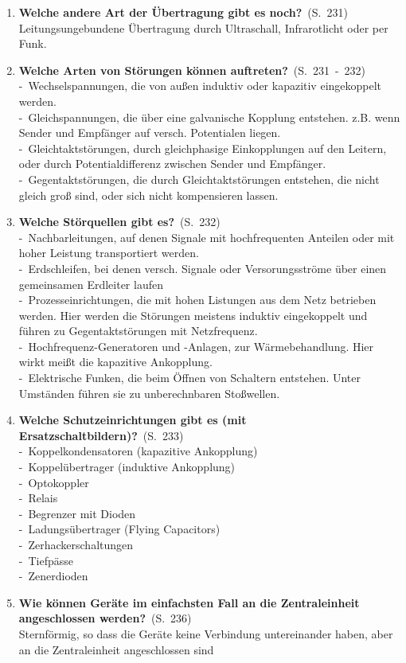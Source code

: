 \documentclass[a4paper,12pt]{article}
\newcommand{\question}[3]{\pagebreak[3]\item {\textbf{#1?}}\ (S.\ #2)#3}
\newcommand{\catchword}[1]{\\-\ #1}
\newcommand{\normaltext}[1]{\\#1}
\newcommand{\page}[1]{#1}
\newcommand{\pages}[2]{#1\ -\ #2}
\begin{document}
\begin{enumerate}
  \question{Welche andere Art der Übertragung gibt es noch}{\page{231}}
  {
    \normaltext{Leitungsungebundene Übertragung durch Ultraschall, Infrarotlicht oder per Funk.}
  }

  \question{Welche Arten von Störungen können auftreten}{\pages{231}{232}}
  {
    \catchword{Wechselspannungen, die von außen induktiv oder kapazitiv eingekoppelt werden.}
    \catchword{Gleichspannungen, die über eine galvanische Kopplung entstehen. z.B. wenn Sender und
               Empfänger auf versch. Potentialen liegen.}
    \catchword{Gleichtaktstörungen, durch gleichphasige Einkopplungen auf den Leitern, oder durch
               Potentialdifferenz zwischen Sender und Empfänger.}
    \catchword{Gegentaktstörungen, die durch Gleichtaktstörungen entstehen, die nicht gleich groß
               sind, oder sich nicht kompensieren lassen.}
  }

  \question{Welche Störquellen gibt es}{\page{232}}
  {
    \catchword{Nachbarleitungen, auf denen Signale mit hochfrequenten Anteilen oder mit hoher
               Leistung transportiert werden.}
    \catchword{Erdschleifen, bei denen versch. Signale oder Versorungsströme über einen gemeinsamen
               Erdleiter laufen}
    \catchword{Prozesseinrichtungen, die mit hohen Listungen aus dem Netz betrieben werden. Hier
               werden die Störungen meistens induktiv eingekoppelt und führen zu Gegentaktstörungen mit
               Netzfrequenz.}
    \catchword{Hochfrequenz-Generatoren und -Anlagen, zur Wärmebehandlung. Hier wirkt meißt die
               kapazitive Ankopplung.}
    \catchword{Elektrische Funken, die beim Öffnen von Schaltern entstehen. Unter Umständen führen
               sie zu unberechnbaren Stoßwellen.}
  }

  \question{Welche Schutzeinrichtungen gibt es (mit Ersatzschaltbildern)}{\page{233}}
  {
    \catchword{Koppelkondensatoren (kapazitive Ankopplung)}
    \catchword{Koppelübertrager (induktive Ankopplung)}
    \catchword{Optokoppler}
    \catchword{Relais}
    \catchword{Begrenzer mit Dioden}
    \catchword{Ladungsübertrager (Flying Capacitors)}
    \catchword{Zerhackerschaltungen}
    \catchword{Tiefpässe}
    \catchword{Zenerdioden}
  }

  \question{Wie können Geräte im einfachsten Fall an die Zentraleinheit angeschlossen
            werden}{\page{236}}
  {
    \normaltext{Sternförmig, so dass die Geräte keine Verbindung untereinander haben, aber
                an die Zentraleinheit angeschlossen sind}
  }


\end{enumerate}
\end{document}
